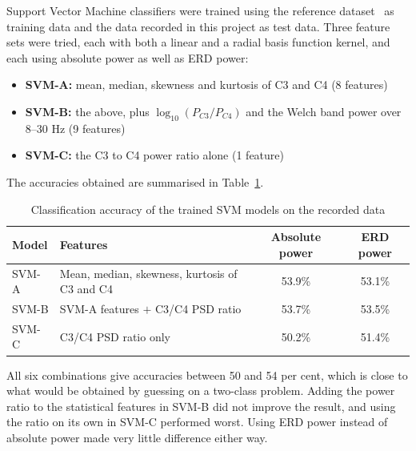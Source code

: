 Support Vector Machine classifiers were trained using the reference
dataset~\cite{liu2024mi} as training data and the data recorded in this project as test
data. Three feature sets were tried, each with both a linear and a radial basis function
kernel, and each using absolute power as well as ERD power:

\begin{itemize}
    \item \textbf{SVM-A:} mean, median, skewness and kurtosis of C3 and C4 (8 features)
    \item \textbf{SVM-B:} the above, plus $\log_{10}(P_{C3}/P_{C4})$ and the Welch band
          power over 8--30 Hz (9 features)
    \item \textbf{SVM-C:} the C3 to C4 power ratio alone (1 feature)
\end{itemize}

The accuracies obtained are summarised in Table~\ref{tab:svm_accuracy}.

\begin{table}[h]
\centering
\caption{Classification accuracy of the trained SVM models on the recorded data}
\label{tab:svm_accuracy}
\begin{tabular}{|l|l|c|c|}
\hline
\textbf{Model} & \textbf{Features} & \textbf{Absolute power} & \textbf{ERD power} \\
\hline
SVM-A & Mean, median, skewness, kurtosis of C3 and C4 & 53.9\% & 53.1\% \\
\hline
SVM-B & SVM-A features $+$ C3/C4 PSD ratio & 53.7\% & 53.5\% \\
\hline
SVM-C & C3/C4 PSD ratio only & 50.2\% & 51.4\% \\
\hline
\end{tabular}
\end{table}

All six combinations give accuracies between 50 and 54 per cent, which is close to what
would be obtained by guessing on a two-class problem. Adding the power ratio to the
statistical features in SVM-B did not improve the result, and using the ratio on its own in
SVM-C performed worst. Using ERD power instead of absolute power made very little
difference either way.

